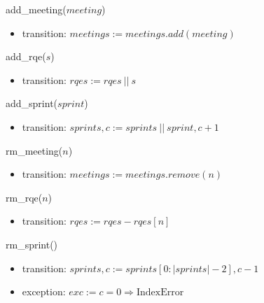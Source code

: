 \documentclass[12pt, titlepage]{article}
\begin{document}
\noindent add\_meeting($meeting$)
\begin{itemize}
    \item transition: $meetings := meetings.add(meeting)$
\end{itemize}

\noindent add\_rqe($s$)
\begin{itemize}
    \item transition: $rqes := rqes\ ||\ s$
\end{itemize}

\noindent add\_sprint($sprint$)
\begin{itemize}
    \item transition: $sprints, c := sprints\ ||\ sprint, c + 1$
\end{itemize}

\noindent rm\_meeting($n$)
\begin{itemize}
    \item transition: $meetings := meetings.remove(n)$
\end{itemize}

\noindent rm\_rqe($n$)
\begin{itemize}
    \item transition: $rqes := rqes - rqes[n]$
\end{itemize}

\noindent rm\_sprint()
\begin{itemize}
    \item transition: $sprints, c := sprints[0: |sprints| - 2], c - 1$
    \item exception: $exc := c = 0 \Rightarrow \text{IndexError}$
\end{itemize}
\end{document}

